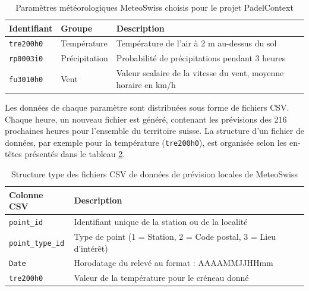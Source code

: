 \documentclass[12pt]{article}
\begin{document}
\vspace{0.5cm}
\begin{table}[H]
    \centering
    \begin{tabularx}{\textwidth}{|l|l|X|}
    \hline
    \rowcolor[gray]{0.9} 
    \textbf{Identifiant} & \textbf{Groupe} & \textbf{Description} \\ \hline
    \texttt{tre200h0} & Température & Température de l'air à 2 m au-dessus du sol \\ \hline
    \texttt{rp0003i0} & Précipitation & Probabilité de précipitations pendant 3 heures \\ \hline
    \texttt{fu3010h0} & Vent & Valeur scalaire de la vitesse du vent, moyenne horaire en km/h \\ \hline
    \end{tabularx}
    \caption{Paramètres météorologiques MeteoSwiss choisis pour le projet PadelContext}
    \label{tab:meteo_params}
\end{table}
\vspace{0.2cm}

Les données de chaque paramètre sont distribuées sous forme de fichiers CSV. Chaque heure, un nouveau fichier est généré, contenant les prévisions des 216 prochaines heures pour l'ensemble du territoire suisse. La structure d'un fichier de données, par exemple pour la température (\texttt{tre200h0}), est organisée selon les en-têtes présentés dans le tableau \ref{tab:csv_structure}.

\vspace{0.5cm}
\begin{table}[H]
    \centering
    \begin{tabularx}{\textwidth}{|l|X|}
    \hline
    \rowcolor[gray]{0.9} 
    \textbf{Colonne CSV} & \textbf{Description} \\ \hline
    \texttt{point\_id} & Identifiant unique de la station ou de la localité \\ \hline
    \texttt{point\_type\_id} & Type de point (1 = Station, 2 = Code postal, 3 = Lieu d'intérêt) \\ \hline
    \texttt{Date} & Horodatage du relevé au format : AAAAMMJJHHmm \\ \hline
    \texttt{tre200h0} & Valeur de la température pour le créneau donné \\ \hline
    \end{tabularx}
    \caption{Structure type des fichiers CSV de données de prévision locales de MeteoSwiss}
    \label{tab:csv_structure}
\end{table}
\vspace{0.2cm}
\end{document}
